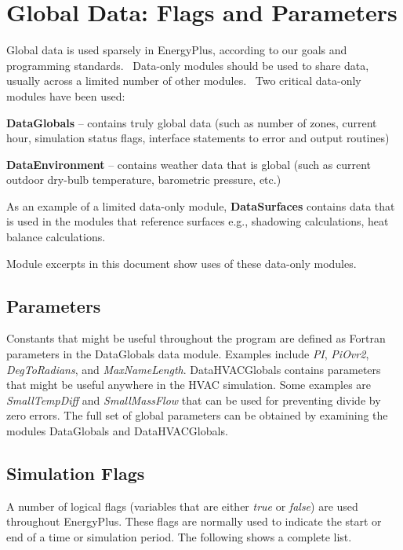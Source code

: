 \section{Global Data: Flags and Parameters}\label{global-data-flags-and-parameters}

Global data is used sparsely in EnergyPlus, according to our goals and programming standards.~ Data-only modules should be used to share data, usually across a limited number of other modules.~ Two critical data-only modules have been used:

\textbf{DataGlobals} -- contains truly global data (such as number of zones, current hour, simulation status flags, interface statements to error and output routines)

\textbf{DataEnvironment} -- contains weather data that is global (such as current outdoor dry-bulb temperature, barometric pressure, etc.)

As an example of a limited data-only module, \textbf{DataSurfaces} contains data that is used in the modules that reference surfaces e.g., shadowing calculations, heat balance calculations.

Module excerpts in this document show uses of these data-only modules.

\subsection{Parameters}\label{parameters}

Constants that might be useful throughout the program are defined as Fortran parameters in the DataGlobals data module. Examples include \emph{PI}, \emph{PiOvr2}, \emph{DegToRadians}, and \emph{MaxNameLength}. DataHVACGlobals contains parameters that might be useful anywhere in the HVAC simulation. Some examples are \emph{SmallTempDiff} and \emph{SmallMassFlow} that can be used for preventing divide by zero errors. The full set of global parameters can be obtained by examining the modules DataGlobals and DataHVACGlobals.

\subsection{Simulation Flags}\label{simulation-flags}

A number of logical flags (variables that are either \emph{true} or \emph{false}) are used throughout EnergyPlus. These flags are normally used to indicate the start or end of a time or simulation period. The following shows a complete list.

